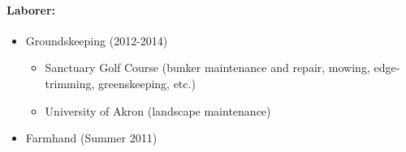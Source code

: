 \documentclass{my_cv}
\begin{document}
\paragraph{Laborer:}
\begin{itemize}
    \item Grounds\-keeping (2012-2014)
    \begin{itemize}
        \item Sanctuary Golf Course (bunker maintenance and repair, mowing, edge-trimming, greens\-keeping, etc.)
        \item University of Akron (landscape maintenance)
    \end{itemize}
    \item Farmhand (Summer 2011)
\end{itemize}
\end{document}
